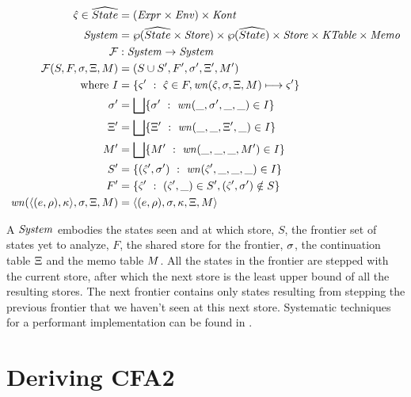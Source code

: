 \documentclass{llncs}
\begin{document}
\begin{align*}
  \hat\varsigma \in \widehat{State} &= (\mathit{Expr} \times \mathit{Env}) \times \mathit{Kont} \\
  \mathit{System} &= \wp(\widehat{State} \times \mathit{Store}) \times \wp(\widehat{State}) \times \mathit{Store} \times \mathit{KTable} \times \mathit{Memo} \\
  {\mathcal F} &: \mathit{System} \to \mathit{System} \\
  {\mathcal F}(S, F, \sigma, \Xi, M) &= (S \cup S', F', \sigma', \Xi', M') \\
  \text{where } I &= \{ \varsigma'\ :\ \hat\varsigma \in F, \mathit{wn}(\hat\varsigma,\sigma,\Xi,M) \longmapsto \varsigma'\} \\
                \sigma' &= \bigsqcup\{ \sigma'\ :\ \mathit{wn}(\_, \sigma',\_,\_) \in I\} \\
                \Xi' &=  \bigsqcup\{ \Xi'\ :\ \mathit{wn}(\_, \_, \Xi', \_) \in I\} \\
                M' &=  \bigsqcup\{ M'\ :\ \mathit{wn}(\_, \_, \_, M') \in I\} \\
                S' &= \{ (\hat\varsigma',\sigma')\ :\ \mathit{wn}(\hat\varsigma', \_, \_, \_) \in I\} \\
                F' &= \{ \hat\varsigma'\ :\ (\hat\varsigma',\_) \in S', (\hat\varsigma',\sigma') \notin S\} \\
                \mathit{wn}(\langle (e,\rho),\kappa \rangle,\sigma,\Xi,M)
                   &= \langle (e,\rho),\sigma,\kappa,\Xi,M \rangle
\end{align*}

A $\mathit{System}$ embodies the states seen and at which store, $S$, the
frontier set of states yet to analyze, $F$, the shared store for the
frontier, $\sigma$, the continuation table $\Xi$ and the memo
table $M$. All the states in the frontier are stepped with the
current store, after which the next store is the least upper bound of
all the resulting stores. The next frontier contains only states
resulting from stepping the previous frontier that we haven't seen at
this next store. Systematic techniques for a performant implementation
can be found in \citet{ianjohnson:oaam:2013}.

\section{Deriving CFA2}
\label{sec:cfa2}
\end{document}
